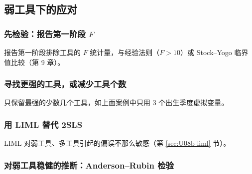\subsection{弱工具下的应对}\label{sec:U08b-weakremedy}

\subsubsection{先检验：报告第一阶段 \texorpdfstring{$F$}{F}}

报告第一阶段排除工具的 $F$ 统计量，与经验法则（$F>10$）或 Stock--Yogo 临界值比较（第 9 章）。

\subsubsection{寻找更强的工具，或减少工具个数}

只保留最强的少数几个工具，如上面案例中只用 3 个出生季度虚拟变量。

\subsubsection{用 LIML 替代 2SLS}

LIML 对弱工具、多工具引起的偏误不那么敏感（第 \ref{sec:U08b-liml} 节）。

\subsubsection{对弱工具稳健的推断：Anderson--Rubin 检验}


